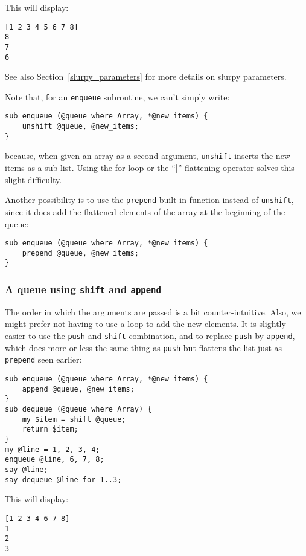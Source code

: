 This will display:

\begin{verbatim}
[1 2 3 4 5 6 7 8]
8
7
6
\end{verbatim}

See also Section~\ref{slurpy_parameters} for more details 
on slurpy parameters.

Note that, for an \verb'enqueue' subroutine, we can't simply 
write:
\begin{verbatim}
sub enqueue (@queue where Array, *@new_items) {
    unshift @queue, @new_items;
}
\end{verbatim}
%
because, when given an array as a second argument, 
{\tt unshift} inserts the new items as a sub-list. 
Using the for loop or the ``|'' flattening operator 
solves this slight difficulty. 

Another possibility is to use the {\tt prepend} built-in 
function instead of {\tt unshift}, since it does add 
the flattened elements of the array at the beginning 
of the queue:

\begin{verbatim}
sub enqueue (@queue where Array, *@new_items) {
    prepend @queue, @new_items;
}
\end{verbatim}

\subsubsection{A queue using {\tt shift} and {\tt append}}

The order in which the arguments are passed is a bit 
counter-intuitive. Also, we might prefer not having to use 
a loop to add the new elements. It is slightly easier to use the {\tt push} 
and {\tt shift} combination, and to replace {\tt push} by 
{\tt append}, which does more or less the same thing as 
{\tt push} but flattens the list just as {\tt prepend} 
seen earlier:

\begin{verbatim}
sub enqueue (@queue where Array, *@new_items) {
    append @queue, @new_items;
}
sub dequeue (@queue where Array) {
    my $item = shift @queue;
    return $item;
}
my @line = 1, 2, 3, 4;
enqueue @line, 6, 7, 8;
say @line;
say dequeue @line for 1..3;
\end{verbatim}

This will display:

\begin{verbatim}
[1 2 3 4 6 7 8]
1
2
3
\end{verbatim}

